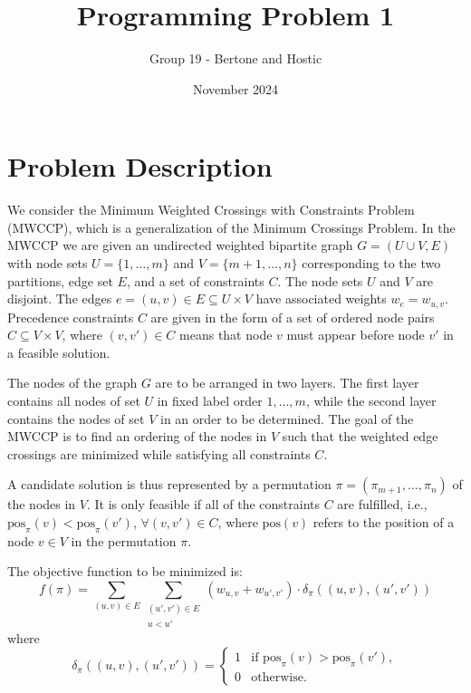 \documentclass{article}
\title{Programming Problem 1}
\author{Group 19 - Bertone and Hostic}
\date{November 2024}
\begin{document}
\maketitle

\section*{Problem Description}
We consider the Minimum Weighted Crossings with Constraints Problem (MWCCP), which is a generalization of the Minimum Crossings Problem. In the MWCCP we are given an undirected weighted bipartite graph \( G = (U \cup V, E) \) with node sets \( U = \{1, \dots, m\} \) and \( V = \{m + 1, \dots, n\} \) corresponding to the two partitions, edge set \( E \), and a set of constraints \( C \). The node sets \( U \) and \( V \) are disjoint. The edges \( e = (u, v) \in E \subseteq U \times V \) have associated weights \( w_e = w_{u,v} \). Precedence constraints \( C \) are given in the form of a set of ordered node pairs \( C \subseteq V \times V \), where \( (v, v') \in C \) means that node \( v \) must appear before node \( v' \) in a feasible solution.

The nodes of the graph \( G \) are to be arranged in two layers. The first layer contains all nodes of set \( U \) in fixed label order \( 1, \dots, m \), while the second layer contains the nodes of set \( V \) in an order to be determined. The goal of the MWCCP is to find an ordering of the nodes in \( V \) such that the weighted edge crossings are minimized while satisfying all constraints \( C \).

A candidate solution is thus represented by a permutation \( \pi = (\pi_{m+1}, \dots, \pi_n) \) of the nodes in \( V \). It is only feasible if all of the constraints \( C \) are fulfilled, i.e., \( \text{pos}_\pi(v) < \text{pos}_\pi(v') \), \( \forall (v, v') \in C \), where \( \text{pos}(v) \) refers to the position of a node \( v \in V \) in the permutation \( \pi \).

The objective function to be minimized is:
\[
f(\pi) = \sum_{(u, v) \in E} \sum_{\substack{(u', v') \in E \\ u < u'}} 
(w_{u,v} + w_{u', v'}) \cdot \delta_{\pi}((u, v), (u', v'))
\]
where
\[
\delta_{\pi}((u, v), (u', v')) = 
\begin{cases} 
1 & \text{if } \text{pos}_{\pi}(v) > \text{pos}_{\pi}(v'), \\ 
0 & \text{otherwise.} 
\end{cases}
\]
\end{document}
